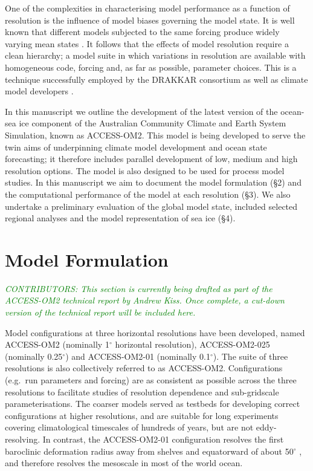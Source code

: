 \documentclass[gmd, manuscript]{copernicus}
\newcommand{\CONTRIBUTORS}[1]{\textcolor{green}{\textsf{\textsl{CONTRIBUTORS: #1}}}}
\begin{document}
One of the complexities in characterising model performance as a function of resolution is the influence of model biases governing the model state.
It is well known that different models subjected to the same forcing produce widely varying mean states \citep[e.g.][]{Danabasoglu2014}.
It follows that the effects of model resolution require a clean hierarchy; a model suite in which variations in resolution are available with homogeneous code, forcing and, as far as possible, parameter choices.
This is a technique successfully employed by the DRAKKAR consortium \citep{Barnier2006} as well as climate model developers \citep[e.g.][]{Hewitt2016}.

In this manuscript we outline the development of the latest version of the ocean-sea ice component of the Australian Community Climate and Earth System Simulation, known as ACCESS-OM2.
This model is being developed to serve the twin aims of underpinning climate model development and ocean state forecasting; it therefore includes parallel development of low, medium and high resolution options.
The model is also designed to be used for process model studies. 
In this manuscript we aim to document the model formulation (\S 2) and the computational performance of the model at each resolution (\S3).
We also undertake a preliminary evaluation of the global model state, included selected regional analyses and the model representation of sea ice (\S4).

\section{Model Formulation}
\CONTRIBUTORS{This section is currently being drafted as part of the ACCESS-OM2 technical report by Andrew Kiss. Once complete, a cut-down version of the technical report will be included here.}

Model configurations at three horizontal resolutions have been developed, named ACCESS-OM2 (nominally 1$^\circ$ horizontal resolution), ACCESS-OM2-025 (nominally 0.25$^\circ$) and ACCESS-OM2-01 (nominally 0.1$^\circ$).
The suite of three resolutions is also collectively referred to as ACCESS-OM2.
Configurations (e.g.\ run parameters and forcing) are as consistent as possible across the three resolutions to facilitate studies of resolution dependence and sub-gridscale parameterisations. 
The coarser models served as testbeds for developing correct configurations at higher resolutions, and are suitable for long experiments covering climatological timescales of hundreds of years, but are not eddy-resolving.
In contrast, the ACCESS-OM2-01 configuration resolves the first baroclinic deformation radius away from shelves and equatorward of about 50$^\circ$ \citep{Hallberg2013a}, and therefore resolves the mesoscale in most of the world ocean. 
\end{document}
